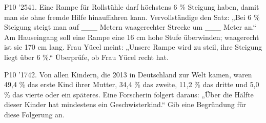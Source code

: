\documentclass[11pt]{article}
\begin{document}
\pfgruppe{}
\begin{pfaufg}{P10 ’25}{41.}{}
Eine Rampe für Rollstühle darf höchstens 6 \% Steigung haben, damit man sie ohne fremde Hilfe hinauffahren kann. Vervollständige den Satz: „Bei 6 \% Steigung steigt man auf \_\_\_ Metern waagerechter Strecke um \_\_\_ Meter an.“ Am Hauseingang soll eine Rampe eine 16 cm hohe Stufe überwinden; waagerecht ist sie 170 cm lang. Frau Yücel meint: „Unsere Rampe wird zu steil, ihre Steigung liegt über 6 \%.“ Überprüfe, ob Frau Yücel recht hat.
\par\smallskip\noindent {}\par
{}
\end{pfaufg}
\pfgruppe{}
\begin{pfaufg}{P10 ’17}{\llap{\textasteriskcentered\,}42.}{}
Von allen Kindern, die 2013 in Deutschland zur Welt kamen, waren 49,4 \% das erste Kind ihrer Mutter, 34,4 \% das zweite, 11,2 \% das dritte und 5,0 \% das vierte oder ein späteres. Eine Forscherin folgert daraus: „Über die Hälfte dieser Kinder hat mindestens ein Geschwisterkind.“ Gib eine Begründung für diese Folgerung an.
\end{pfaufg}
\end{document}
